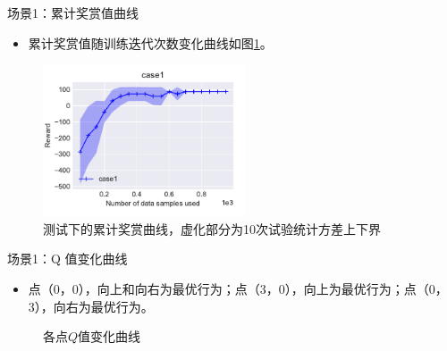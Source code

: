 \documentclass{beamer}
\begin{document}
\begin{frame}{场景1：累计奖赏值曲线}
    \begin{itemize}
        \item 累计奖赏值随训练迭代次数变化曲线如图\ref{fig:case1}。
    \end{itemize}
\begin{figure}
    \centering
    \includegraphics[width=6.0cm]{pic/case1/case1.pdf}
    \caption{测试下的累计奖赏曲线，虚化部分为10次试验统计方差上下界}
    \label{fig:case1}
\end{figure}
\end{frame}

\begin{frame}{场景1：Q 值变化曲线}
    \begin{itemize}
        \item 点（0，0），向上和向右为最优行为；点（3，0），向上为最优行为；点（0，3），向右为最优行为。
    \end{itemize}
    \begin{figure}
      \centering
      \qquad
      \qquad
      \qquad
    \caption{各点$Q$值变化曲线}
    \label{figcase1Q}
    \end{figure}
\end{frame}
\end{document}
